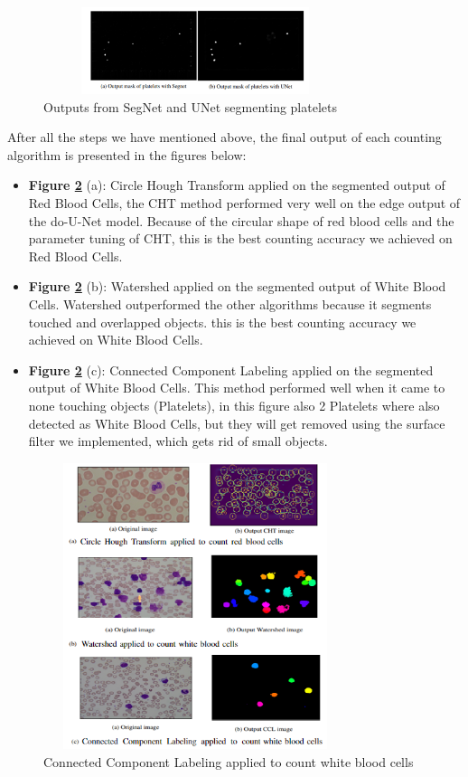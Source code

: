 \documentclass[conference]{IEEEtran}
\begin{document}
\begin{figure}[ht]
  \centering
  \includegraphics[width = 3.5in,height=1in]{../images/plt.png}
  \caption{Outputs from SegNet and UNet segmenting platelets}
  \label{fig:plts}
    \vspace*{-0.5cm}
\end{figure}

After all the steps we have mentioned above, the final output of each counting algorithm is presented in the figures below:

\begin{itemize}
  \item \textbf{Figure \ref{fig:ccl_output}} (a): Circle Hough Transform applied on the segmented output of Red Blood Cells, the CHT method performed very well on the edge output of the do-U-Net model.
    Because of the circular shape of red blood cells and the parameter tuning of CHT, this is the best counting accuracy we achieved on Red Blood Cells.
  \item \textbf{Figure \ref{fig:ccl_output}} (b): Watershed applied on the segmented output of White Blood Cells. Watershed outperformed the other algorithms because it segments touched and overlapped objects. this is the best counting accuracy we achieved on White Blood Cells.
  \item \textbf{Figure \ref{fig:ccl_output}} (c): Connected Component Labeling applied on the segmented output of White Blood Cells. This method performed well when it came to none touching objects (Platelets), in this figure also 2 Platelets where also detected as White Blood Cells, but they will get removed using the surface filter we implemented, which gets rid of small objects.
\end{itemize}

\vspace*{-0.4cm}
\begin{figure}[ht]
  \centering
  \includegraphics[width = 3.5in,height=3.3in]{../images/result.png}
  \caption{Connected Component Labeling applied to count white blood cells}
  \label{fig:ccl_output}
    \vspace*{-0.5cm}
\end{figure}
  \vspace*{-0.2cm}
\end{document}
